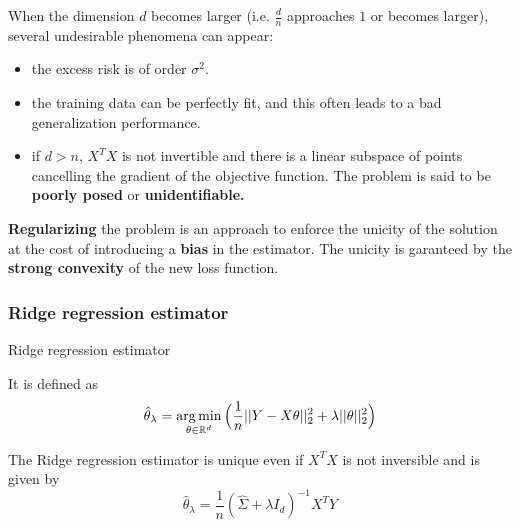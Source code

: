 \documentclass[
10pt, %
a4paper, %
oneside, %
headinclude,footinclude, %
BCOR5mm, %
]{scrartcl}
\begin{document}
When the dimension $d$ becomes larger (i.e. $ \frac{d}{n} $ approaches $1$ or becomes larger), several undesirable phenomena can appear:
\begin{itemize}
    \item the excess risk is of order $ \sigma^2$.
    \item the training data can be perfectly fit, and this often leads to a bad generalization performance.
    \item if $d>n$, $X^TX$ is not invertible and there is a linear subspace of points cancelling the gradient of the objective function. The problem is said to be \textbf{{poorly posed}} or \textbf{{unidentifiable.}}
\end{itemize}

\textbf{{Regularizing}} the problem is an approach to enforce the unicity of the solution at the cost of introducing a \textbf{{bias}} in the estimator. The unicity is garanteed by the \textbf{{strong convexity}} of the new loss function.

\subsubsection{\large\color{Periwinkle}Ridge regression estimator}

\begin{definition}{Ridge regression estimator}

    It is defined as
\begin{equation}
    \label{risk:ridge}
    \hat{ \theta}_{\lambda} = \operatorname*{arg\,min}_{\theta \in \mathbb{R}^d} \Big( \frac{1}{n} ||Y-X\theta||_2^2 + \lambda || \theta||_2^2 \Big)
\end{equation}
\end{definition}


\begin{proposition}

    The Ridge regression estimator is unique even if $X^TX$ is not inversible and is given by
    \begin{equation*}
	\hat{ \theta}_{\lambda} = \frac{1}{n} ( \hat{\Sigma} +\lambda I_d)^{-1}X^TY
    \end{equation*}
\end{proposition}
\end{document}
